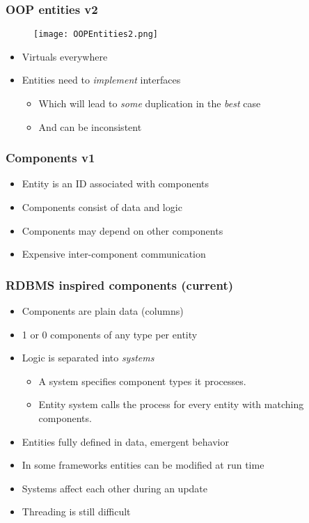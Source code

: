 \documentclass[ignorenonframetext,]{beamer}
\begin{document}
\begin{frame}\frametitle{OOP entities v2}

\begin{figure}[h!]
\centerline{\texttt{[image: OOPEntities2.png]}}
\end{figure}

\begin{itemize}
\item
  Virtuals everywhere
\item
  Entities need to \emph{implement} interfaces

  \begin{itemize}
  \item
    Which will lead to \emph{some} duplication in the \emph{best} case
  \item
    And can be inconsistent
  \end{itemize}
\end{itemize}

\end{frame}

\begin{frame}\frametitle{Components v1}

\begin{itemize}
\item
  Entity is an ID associated with components
\item
  Components consist of data and logic
\item
  Components may depend on other components
\item
  Expensive inter-component communication
\end{itemize}

\end{frame}

\begin{frame}\frametitle{RDBMS inspired components (current)}

\begin{itemize}
\item
  Components are plain data (columns)
\item
  1 or 0 components of any type per entity
\item
  Logic is separated into \emph{systems}

  \begin{itemize}
  \item
    A system specifies component types it processes.
  \item
    Entity system calls the process for every entity with matching
    components.
  \end{itemize}
\item
  Entities fully defined in data, emergent behavior
\item
  In some frameworks entities can be modified at run time
\item
  Systems affect each other during an update
\item
  Threading is still difficult
\end{itemize}

\end{frame}
\end{document}
